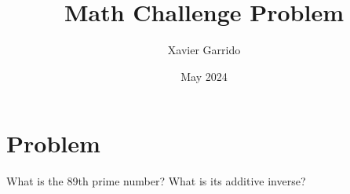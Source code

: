 \documentclass{article}
\title{Math Challenge Problem}
\author{Xavier Garrido}
\date{May 2024}
\begin{document}
\maketitle

\setcounter{section}{1}
\section{Problem}

What is the 89th prime number?
What is its additive inverse?
\end{document}
